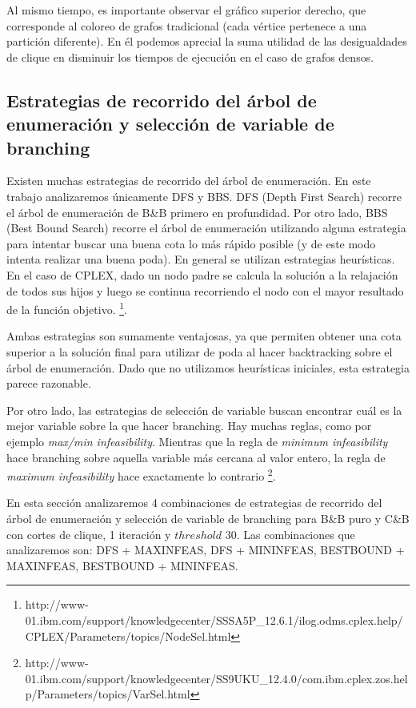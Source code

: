 Al mismo tiempo, es importante observar el gráfico superior derecho, que corresponde al coloreo de grafos tradicional (cada vértice pertenece a una partición diferente). En él podemos aprecial la suma utilidad de las desigualdades de clique en disminuir los tiempos de ejecución en el caso de grafos densos. 

\pagebreak

\subsection{Estrategias de recorrido del árbol de enumeración
y selección de variable de branching}

Existen muchas estrategias de recorrido del árbol de enumeración. En este trabajo analizaremos únicamente DFS y BBS. DFS (Depth First Search) recorre el árbol de enumeración de B\&B primero en profundidad. Por otro lado, BBS (Best Bound Search) recorre el árbol de enumeración utilizando alguna estrategia para intentar buscar una buena cota lo más rápido posible (y de este modo intenta realizar una buena poda). En general se utilizan estrategias heurísticas. En el caso de CPLEX, dado un nodo padre se calcula la solución a la relajación de todos sus hijos y luego se continua recorriendo el nodo con el mayor resultado de la función objetivo. \footnote{http://www-01.ibm.com/support/knowledgecenter/SSSA5P\_12.6.1/ilog.odms.cplex.help/CPLEX/Parameters/topics/NodeSel.html}.

Ambas estrategias son sumamente ventajosas, ya que permiten obtener una cota superior a la solución final para utilizar de poda al hacer backtracking sobre el árbol de enumeración. Dado que no utilizamos heurísticas iniciales, esta estrategia parece razonable. 

Por otro lado, las estrategias de selección de variable buscan encontrar cuál es la mejor variable sobre la que hacer branching. Hay muchas reglas, como por ejemplo \textit{max/min infeasibility}. Mientras que la regla de \textit{minimum infeasibility} hace branching sobre aquella variable más cercana al valor entero, la regla de \textit{maximum infeasibility} hace exactamente lo contrario \footnote{http://www-01.ibm.com/support/knowledgecenter/SS9UKU\_12.4.0/com.ibm.cplex.zos.help/Parameters/topics/VarSel.html}.

En esta sección analizaremos 4 combinaciones de estrategias de recorrido del árbol de enumeración y selección de variable de branching para B\&B puro y C\&B con cortes de clique, 1 iteración y $threshold$ 30. Las combinaciones que analizaremos son: DFS + MAXINFEAS, DFS + MININFEAS, BESTBOUND + MAXINFEAS, BESTBOUND + MININFEAS.

